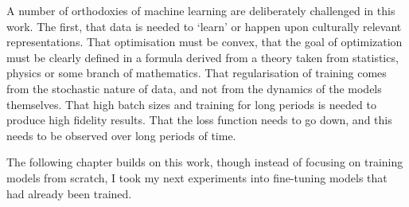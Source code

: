 A number of orthodoxies of machine learning are deliberately challenged in this work. 
The first, that data is needed to ‘learn’ or happen upon culturally relevant representations. That optimisation must be convex, that the goal of optimization must be clearly defined in a formula derived from a theory taken from statistics, physics or some branch of mathematics. 
That regularisation of training comes from the stochastic nature of data, and not from the dynamics of the models themselves. 
That high batch sizes and training for long periods is needed to produce high fidelity results. 
That the loss function needs to go down, and this needs to be observed over long periods of time.

The following chapter builds on this work, though instead of focusing on training models from scratch, I took my next experiments into fine-tuning models that had already been trained.